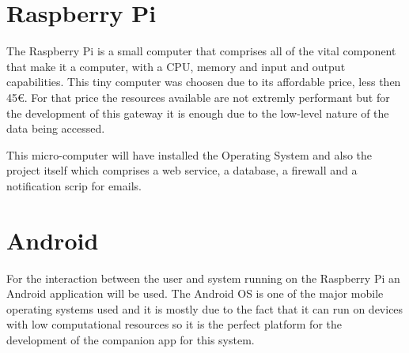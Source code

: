 




\section{Raspberry Pi}
\label{chap2:sec:rasp}
The Raspberry Pi is a small computer that comprises all of the vital component
that make it a computer, with a CPU, memory and input and output capabilities.
This tiny computer was choosen due to its affordable price, less then 45€. For
that price the resources available are not extremly performant but for the
development of this gateway it is enough due to the low-level nature of the data
being accessed.

This micro-computer will have installed the Operating System and also the
project itself which comprises a web service, a database, a firewall and a
notification scrip for emails.


\section{Android}
\label{chap2:sec:android}
For the interaction between the user and system running on the Raspberry Pi an
Android application will be used. The Android OS is one of the major mobile
operating systems used and it is mostly due to the fact that it can run on
devices with low computational resources so it is the perfect platform for the
development of the companion app for this system.

